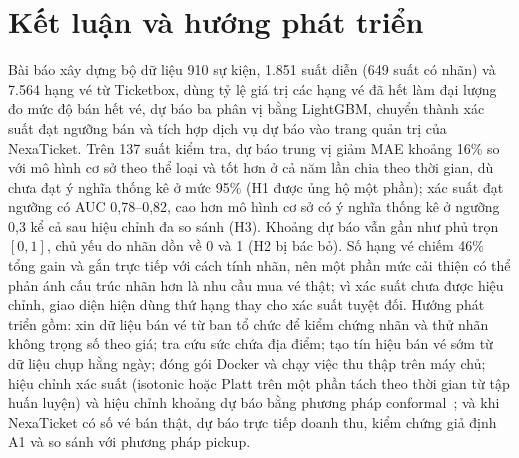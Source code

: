 \documentclass{IEEEtran}
\begin{document}
\section{Kết luận và hướng phát triển}
\label{sec:conclusion}
Bài báo xây dựng bộ dữ liệu 910 sự kiện, 1.851 suất diễn (649 suất có nhãn) và 7.564 hạng vé từ Ticketbox, dùng tỷ lệ giá trị các hạng vé đã hết làm đại lượng đo mức độ bán hết vé, dự báo ba phân vị bằng LightGBM, chuyển thành xác suất đạt ngưỡng bán và tích hợp dịch vụ dự báo vào trang quản trị của NexaTicket. Trên 137 suất kiểm tra, dự báo trung vị giảm MAE khoảng 16\% so với mô hình cơ sở theo thể loại và tốt hơn ở cả năm lần chia theo thời gian, dù chưa đạt ý nghĩa thống kê ở mức 95\% (H1 được ủng hộ một phần); xác suất đạt ngưỡng có AUC 0,78--0,82, cao hơn mô hình cơ sở có ý nghĩa thống kê ở ngưỡng 0,3 kể cả sau hiệu chỉnh đa so sánh (H3). Khoảng dự báo vẫn gần như phủ trọn $[0, 1]$, chủ yếu do nhãn dồn về 0 và 1 (H2 bị bác bỏ). Số hạng vé chiếm 46\% tổng gain và gắn trực tiếp với cách tính nhãn, nên một phần mức cải thiện có thể phản ánh cấu trúc nhãn hơn là nhu cầu mua vé thật; vì xác suất chưa được hiệu chỉnh, giao diện hiện dùng thứ hạng thay cho xác suất tuyệt đối. Hướng phát triển gồm: xin dữ liệu bán vé từ ban tổ chức để kiểm chứng nhãn và thử nhãn không trọng số theo giá; tra cứu sức chứa địa điểm; tạo tín hiệu bán vé sớm từ dữ liệu chụp hằng ngày; đóng gói Docker và chạy việc thu thập trên máy chủ; hiệu chỉnh xác suất (isotonic hoặc Platt trên một phần tách theo thời gian từ tập huấn luyện) và hiệu chỉnh khoảng dự báo bằng phương pháp conformal~\cite{romano2019}; và khi NexaTicket có số vé bán thật, dự báo trực tiếp doanh thu, kiểm chứng giả định A1 và so sánh với phương pháp pickup.
\end{document}
